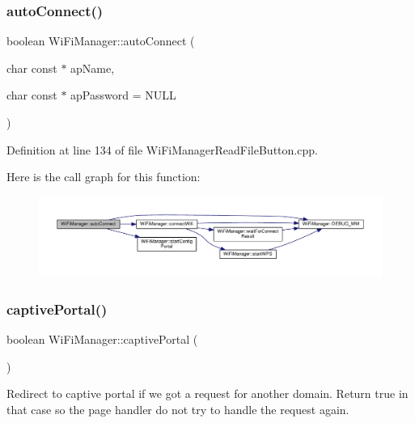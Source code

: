 \subsubsection{\texorpdfstring{auto\+Connect()}{autoConnect()}\hspace{0.1cm}{\footnotesize\ttfamily [2/2]}}
{\footnotesize\ttfamily boolean Wi\+Fi\+Manager\+::auto\+Connect (\begin{DoxyParamCaption}\item[{char const $\ast$}]{ap\+Name,  }\item[{char const $\ast$}]{ap\+Password = {\ttfamily NULL} }\end{DoxyParamCaption})}



Definition at line 134 of file Wi\+Fi\+Manager\+Read\+File\+Button.\+cpp.

Here is the call graph for this function\+:\nopagebreak
\begin{figure}[H]
\begin{center}
\leavevmode
\includegraphics[width=350pt]{class_wi_fi_manager_ab1d094034e5e3e36e2e1b3624edad469_cgraph}
\end{center}
\end{figure}
\mbox{\label{class_wi_fi_manager_a4ef4298deb224212e5242c456669a973}} 
\subsubsection{\texorpdfstring{captive\+Portal()}{captivePortal()}}
{\footnotesize\ttfamily boolean Wi\+Fi\+Manager\+::captive\+Portal (\begin{DoxyParamCaption}{ }\end{DoxyParamCaption})\hspace{0.3cm}{\ttfamily [private]}}

Redirect to captive portal if we got a request for another domain. Return true in that case so the page handler do not try to handle the request again. 

